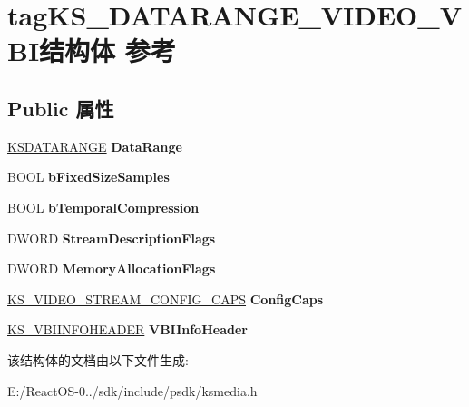 \hypertarget{structtag_k_s___d_a_t_a_r_a_n_g_e___v_i_d_e_o___v_b_i}{}\section{tag\+K\+S\+\_\+\+D\+A\+T\+A\+R\+A\+N\+G\+E\+\_\+\+V\+I\+D\+E\+O\+\_\+\+V\+B\+I结构体 参考}
\label{structtag_k_s___d_a_t_a_r_a_n_g_e___v_i_d_e_o___v_b_i}
\subsection*{Public 属性}
\begin{DoxyCompactItemize}
\item 
\mbox{\label{structtag_k_s___d_a_t_a_r_a_n_g_e___v_i_d_e_o___v_b_i_a78c124deac3935b037ba0483a811c391}} 
\hyperlink{struct_k_s_d_a_t_a_f_o_r_m_a_t}{K\+S\+D\+A\+T\+A\+R\+A\+N\+GE} {\bfseries Data\+Range}
\item 
\mbox{\label{structtag_k_s___d_a_t_a_r_a_n_g_e___v_i_d_e_o___v_b_i_adf04f9ccba8c6d45d631651ae939b777}} 
B\+O\+OL {\bfseries b\+Fixed\+Size\+Samples}
\item 
\mbox{\label{structtag_k_s___d_a_t_a_r_a_n_g_e___v_i_d_e_o___v_b_i_ac773222083176cb318666983eba3b68d}} 
B\+O\+OL {\bfseries b\+Temporal\+Compression}
\item 
\mbox{\label{structtag_k_s___d_a_t_a_r_a_n_g_e___v_i_d_e_o___v_b_i_abec13033b267898801e45abc385b31a7}} 
D\+W\+O\+RD {\bfseries Stream\+Description\+Flags}
\item 
\mbox{\label{structtag_k_s___d_a_t_a_r_a_n_g_e___v_i_d_e_o___v_b_i_ab0a8f5fa54e4f450c1a50cb062f7f9f4}} 
D\+W\+O\+RD {\bfseries Memory\+Allocation\+Flags}
\item 
\mbox{\label{structtag_k_s___d_a_t_a_r_a_n_g_e___v_i_d_e_o___v_b_i_ac3f4c4fdef56e95b4f4606289bf8d33d}} 
\hyperlink{struct___k_s___v_i_d_e_o___s_t_r_e_a_m___c_o_n_f_i_g___c_a_p_s}{K\+S\+\_\+\+V\+I\+D\+E\+O\+\_\+\+S\+T\+R\+E\+A\+M\+\_\+\+C\+O\+N\+F\+I\+G\+\_\+\+C\+A\+PS} {\bfseries Config\+Caps}
\item 
\mbox{\label{structtag_k_s___d_a_t_a_r_a_n_g_e___v_i_d_e_o___v_b_i_ac50cf64b37c01288cc47bfeba530c718}} 
\hyperlink{structtag_k_s___v_b_i_i_n_f_o_h_e_a_d_e_r}{K\+S\+\_\+\+V\+B\+I\+I\+N\+F\+O\+H\+E\+A\+D\+ER} {\bfseries V\+B\+I\+Info\+Header}
\end{DoxyCompactItemize}


该结构体的文档由以下文件生成\+:\begin{DoxyCompactItemize}
\item 
E\+:/\+React\+O\+S-\/0../sdk/include/psdk/ksmedia.\+h\end{DoxyCompactItemize}
